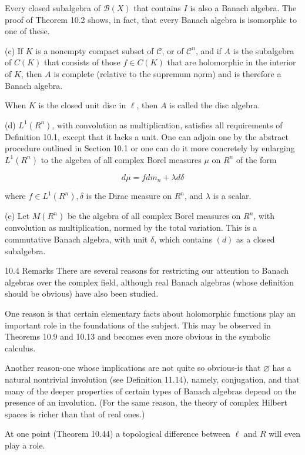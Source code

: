 \documentclass[10pt]{article}
\begin{document}
Every closed subalgebra of $\mathscr{B}(X)$ that contains $I$ is also a Banach algebra. The proof of Theorem 10.2 shows, in fact, that every Banach algebra is isomorphic to one of these.

(c) If $K$ is a nonempty compact subset of $\mathscr{C}$, or of $\mathscr{C}^{n}$, and if $A$ is the subalgebra of $C(K)$ that consists of those $f \in C(K)$ that are holomorphic in the interior of $K$, then $A$ is complete (relative to the supremum norm) and is therefore a Banach algebra.

When $K$ is the closed unit disc in $\ell$, then $A$ is called the disc algebra.

(d) $L^{1}\left(R^{n}\right)$, with convolution as multiplication, satisfies all requirements of Definition 10.1, except that it lacks a unit. One can adjoin one by the abstract procedure outlined in Section 10.1 or one can do it more concretely by enlarging $L^{1}\left(R^{n}\right)$ to the algebra of all complex Borel measures $\mu$ on $R^{n}$ of the form

$$
d \mu=f d m_{n}+\lambda d \delta
$$

where $f \in L^{1}\left(R^{n}\right), \delta$ is the Dirac measure on $R^{n}$, and $\lambda$ is a scalar.

(e) Let $M\left(R^{n}\right)$ be the algebra of all complex Borel measures on $R^{n}$, with convolution as multiplication, normed by the total variation. This is a commutative Banach algebra, with unit $\delta$, which contains $(d)$ as a closed subalgebra.

10.4 Remarks There are several reasons for restricting our attention to Banach algebras over the complex field, although real Banach algebras (whose definition should be obvious) have also been studied.

One reason is that certain elementary facts about holomorphic functions play an important role in the foundations of the subject. This may be observed in Theorems 10.9 and 10.13 and becomes even more obvious in the symbolic calculus.

Another reason-one whose implications are not quite so obvious-is that $\varnothing$ has a natural nontrivial involution (see Definition 11.14), namely, conjugation, and that many of the deeper properties of certain types of Banach algebras depend on the presence of an involution. (For the same reason, the theory of complex Hilbert spaces is richer than that of real ones.)

At one point (Theorem 10.44) a topological difference between $\ell$ and $R$ will even play a role.
\end{document}
